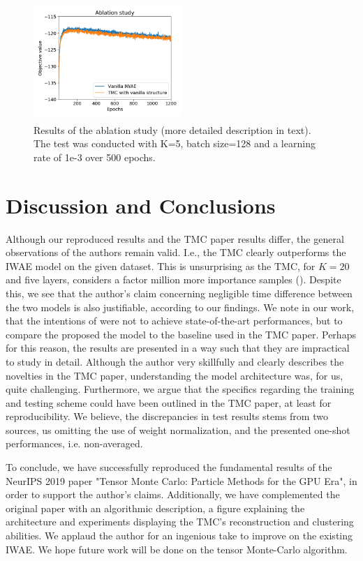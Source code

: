 \documentclass{article}
\begin{document}
\begin{figure}[th!]
    \centering
    \includegraphics[width=0.5\textwidth, height=4.5cm]{Figures/ablation_study_tmc.png}
    \caption{Results of the ablation study (more detailed description in text). The test was conducted with K=5, batch size=128 and a learning rate of 1e-3 over 500 epochs.}
    \label{fig:ablation_study}
\end{figure}
\section{Discussion and Conclusions}
Although our reproduced results and the TMC paper results differ,
the general observations of the authors remain valid. I.e., the TMC clearly outperforms the IWAE model on the given dataset. This is unsurprising as the TMC, for $K=20$ and five layers, considers a factor million more importance samples (\cite{tmc}). Despite this, we see that the author's claim concerning negligible time difference between the two models is also justifiable, according to our findings. We note in our work, that the intentions of \cite{tmc} were not to achieve state-of-the-art performances, but to compare the proposed the model to the baseline used in the TMC paper. Perhaps for this reason, the results are presented in a way such that they are impractical to study in detail. Although the author very skillfully and clearly describes the novelties in the TMC paper, understanding the model architecture was, for us, quite challenging. Furthermore, we argue that the specifics regarding the training and testing scheme could have been outlined in the TMC paper, at least for reproducibility.
We believe, the discrepancies in test results stems from two sources, us omitting the use of weight normalization, and the presented one-shot performances, i.e. non-averaged. 

To conclude, we have successfully reproduced the fundamental results of the NeurIPS 2019 paper "Tensor Monte Carlo: Particle Methods for the GPU Era", in order to support the author's claims. Additionally, we have complemented the original paper with an algorithmic description, a figure explaining the architecture and experiments displaying the TMC's reconstruction and clustering abilities. We applaud the author for an ingenious take to improve on the existing IWAE. We hope future work will be done on the tensor Monte-Carlo algorithm. 
\end{document}
